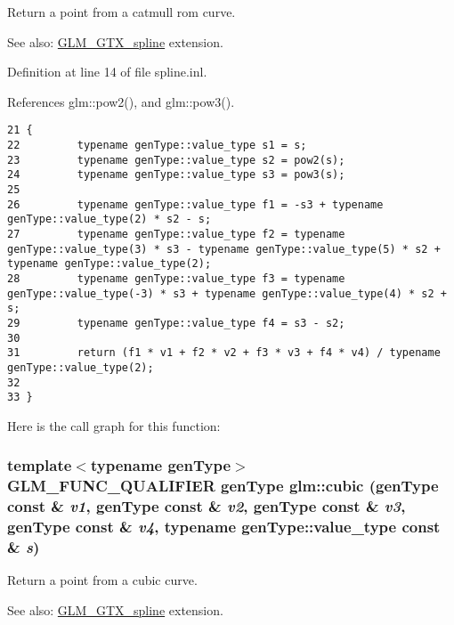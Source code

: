 Return a point from a catmull rom curve. \begin{Desc}
\item[See also:]\hyperlink{group__gtx__spline}{GLM\_\-GTX\_\-spline} extension. \end{Desc}


Definition at line 14 of file spline.inl.

References glm::pow2(), and glm::pow3().

\begin{Code}\begin{verbatim}21 {
22         typename genType::value_type s1 = s;
23         typename genType::value_type s2 = pow2(s);
24         typename genType::value_type s3 = pow3(s);
25 
26         typename genType::value_type f1 = -s3 + typename genType::value_type(2) * s2 - s;
27         typename genType::value_type f2 = typename genType::value_type(3) * s3 - typename genType::value_type(5) * s2 + typename genType::value_type(2);
28         typename genType::value_type f3 = typename genType::value_type(-3) * s3 + typename genType::value_type(4) * s2 + s;
29         typename genType::value_type f4 = s3 - s2;
30 
31         return (f1 * v1 + f2 * v2 + f3 * v3 + f4 * v4) / typename genType::value_type(2);
32 
33 }
\end{verbatim}
\end{Code}




Here is the call graph for this function:\hypertarget{group__gtx__spline_g46e54d27ad211a24813f19b80aba0329}{
\subsubsection[cubic]{\setlength{\rightskip}{0pt plus 5cm}template$<$typename genType$>$ GLM\_\-FUNC\_\-QUALIFIER genType glm::cubic (genType const \& {\em v1}, \/  genType const \& {\em v2}, \/  genType const \& {\em v3}, \/  genType const \& {\em v4}, \/  typename genType::value\_\-type const \& {\em s})}}
\label{group__gtx__spline_g46e54d27ad211a24813f19b80aba0329}


Return a point from a cubic curve. \begin{Desc}
\item[See also:]\hyperlink{group__gtx__spline}{GLM\_\-GTX\_\-spline} extension. \end{Desc}


